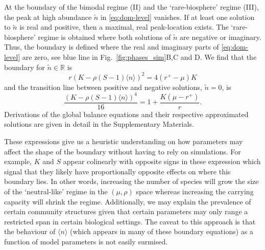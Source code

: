 \documentclass[9pt,twocolumn,twoside,lineno]{pnas-new}
\begin{document}
At the boundary of the bimodal regime (II) and the `rare-biosphere' regime (III), the peak at high abundance $\tilde{n}$ in \eqref{eq:dom-level} vanishes. %
If at least one solution to $\tilde{n}$ is real and positive, then a maximal, real peak-location exists. 
The `rare-biosphere' regime is obtained where both solutions of $\tilde{n}$ are negative or imaginary.  
Thus, the boundary is defined where the real and imaginary parts of \eqref{eq:dom-level} are zero, see blue line in Fig.~\ref{fig:phases_sim}B,C and D.
We find that the boundary for $\tilde{n}\in \mathbb R$ is
\begin{equation}
\label{eq:boundary-I}
r(K-\rho (S-1) \langle n \rangle )^2=4(r^+-\mu){K}
\end{equation}
and the transition line between positive and negative solutions, $\tilde{n}=0$, is
\begin{equation}
    \frac{(K- \rho (S-1) \langle n \rangle )^4}{16}=1+ \frac{K(\mu-r^+)}{r}.
\end{equation}
Derivations of the global balance equations and their respective approximated solutions are given in detail in the Supplementary Materials.

These expressions give us a heuristic understanding on how parameters may affect the shape of the boundary without having to rely on simulations.
For example, $K$ and $S$ appear colinearly with opposite signs in these expression which signal that they likely have proportionally opposite effects on where this boundary lies.
In other words, increasing the number of species will grow the size of the `neutral-like' regime in the $(\mu,\rho)$ space whereas increasing the carrying capacity will shrink the regime.
Additionally, we may explain the prevalence of certain community structures given that certain parameters may only range a restricted span in certain biological settings. 
The caveat to this approach is that the behaviour of $\langle n \rangle$ (which appears in many of these boundary equations) as a function of model parameters is not easily surmised. 
\end{document}
